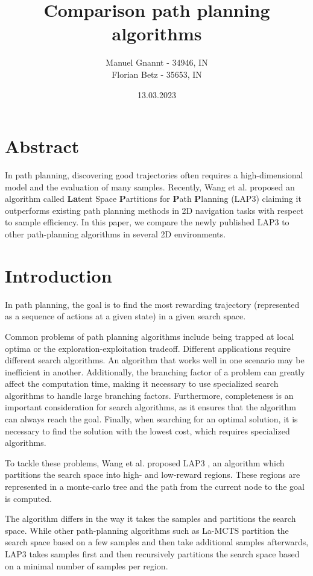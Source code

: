 \documentclass[bibliography=totoc]{scrartcl}
\title{Comparison path planning algorithms}
\author{Manuel Gnannt - 34946, IN \\ Florian Betz - 35653, IN}
\date{13.03.2023}%
\begin{document}
\maketitle
\tableofcontents

\clearpage
\section{Abstract}
In path planning, discovering good trajectories often requires a high-dimensional model and the evaluation of many samples. Recently, Wang et al. proposed an algorithm called \textbf{La}tent Space \textbf{P}artitions for \textbf{P}ath \textbf{P}lanning (LAP3) claiming it outperforms existing path planning methods in 2D navigation tasks with respect to sample efficiency. In this paper, we compare the newly published LAP3 to other path-planning algorithms in several 2D environments.

\section{Introduction}
In path planning, the goal is to find the most rewarding trajectory (represented as a sequence of actions at a given state) in a given search space. 

Common problems of path planning algorithms include being trapped at local optima or the exploration-exploitation tradeoff.
Different applications require different search algorithms.
An algorithm that works well in one scenario may be inefficient in another. 
Additionally, the branching factor of a problem can greatly affect the computation time, making it necessary to use specialized search algorithms to handle large branching factors. 
Furthermore, completeness is an important consideration for search algorithms, as it ensures that the algorithm can always reach the goal. 
Finally, when searching for an optimal solution, it is necessary to find the solution with the lowest cost, which requires specialized algorithms.

To tackle these problems, Wang et al. proposed LAP3 \cite{NEURIPS2021_03a3655f}, an algorithm which partitions the search space into high- and low-reward regions. These regions are represented in a monte-carlo tree and the path from the current node to the goal is computed.

The algorithm differs in the way it takes the samples and partitions the search space. While other path-planning algorithms such as La-MCTS \cite{DBLP:journals/corr/abs-2007-00708} partition the search space based on a few samples and then take additional samples afterwards, LAP3 takes samples first and then recursively partitions the search space based on a minimal number of samples per region.
\end{document}

